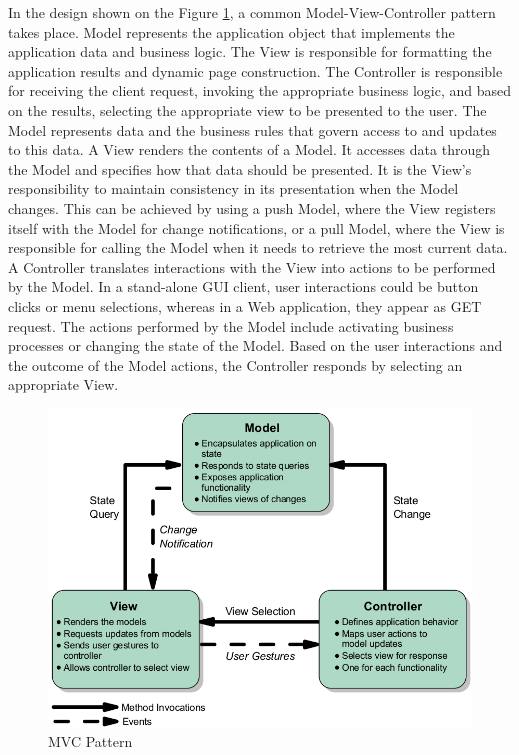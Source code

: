     In the design shown on the Figure \ref{img:MVCPattern}, a common Model-View-Controller pattern takes place. Model represents the application object that implements the application data and business logic. The View is responsible for formatting the application results and dynamic page construction. The Controller is responsible for receiving the client request, invoking the appropriate business logic, and based on the results, selecting the appropriate view to be presented to the user. The Model represents data and the business rules that govern access to and updates to this data. A View renders the contents of a Model. It accesses data through the Model and specifies how that data should be presented. It is the View's responsibility to maintain consistency in its presentation when the Model changes. This can be achieved by using a push Model, where the View registers itself with the Model for change notifications, or a pull Model, where the View is responsible for calling the Model when it needs to retrieve the most current data. A Controller translates interactions with the View into actions to be performed by the Model. In a stand-alone GUI client, user interactions could be button clicks or menu selections, whereas in a Web application, they appear as GET request. The actions performed by the Model include activating business processes or changing the state of the Model. Based on the user interactions and the outcome of the Model actions, the Controller responds by selecting an appropriate View.

     \begin{figure}[!ht]
     \centering
     \includegraphics[scale=0.5]{images/MVCPattern.png}   
     \caption[MVC Pattern]{MVC Pattern}
     \label{img:MVCPattern}                           
     \end{figure}
  
